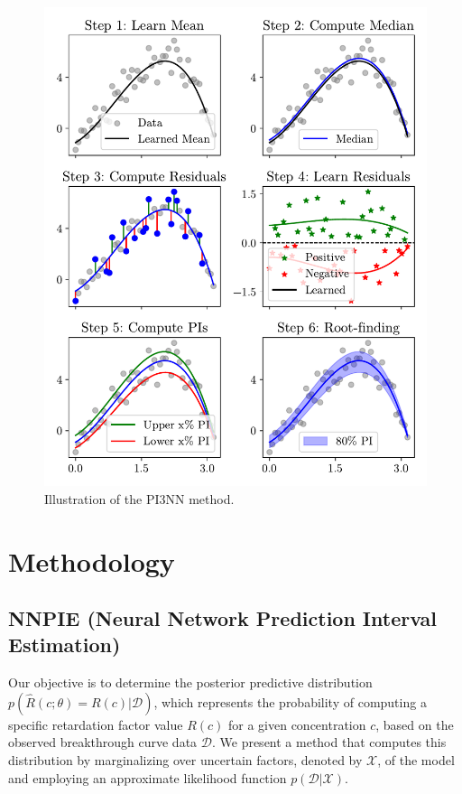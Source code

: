 \begin{figure}[h]
    \centering
    \includegraphics{figs/3pinn_illustration.pdf}
    \caption{Illustration of the PI3NN method.}
    \label{fig:3pinn_illustration}
\end{figure}





\chapter{Methodology}
\label{sec:methodology}
\section{NNPIE (Neural Network Prediction Interval Estimation)}
Our objective is to determine the posterior predictive distribution $p(\hat{R}(c; \theta) = R(c)| \mathcal{D})$, which represents the probability of computing a specific retardation factor value $R(c)$ for a given concentration $c$, based on the observed breakthrough curve data $\mathcal{D}$. We present a method that computes this distribution by marginalizing over uncertain factors, denoted by $\mathcal{X}$, of the model and employing an approximate likelihood function $p(\mathcal{D} | \mathcal{X})$.


